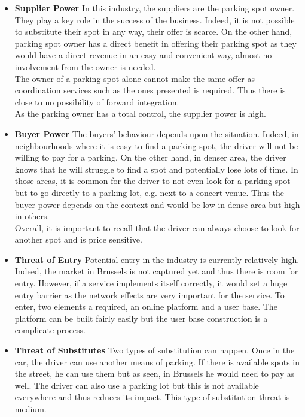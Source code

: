 \documentclass[12pt,a4paper,oneside]{book}
\begin{document}
\begin{itemize}
\item \textbf{Supplier Power} In this industry, the suppliers are the parking spot owner. They play a key role in the success of the business. Indeed, it is not possible to substitute their spot in any way, their offer is scarce. On the other hand, parking spot owner has a direct benefit in offering their parking spot as they would have a direct revenue in an easy and convenient way, almost no involvement from the owner is needed.\\
The owner of a parking spot alone cannot make the same offer as coordination services such as the ones presented is required. Thus there is close to no possibility of forward integration.\\
As the parking owner has a total control, the supplier power is high.
\item \textbf{Buyer Power} The buyers' behaviour depends upon the situation. Indeed, in neighbourhoods where it is easy to find a parking spot, the driver will not be willing to pay for a parking. On the other hand, in denser area, the driver knows that he will struggle to find a spot and potentially lose lots of time. In those areas, it is common for the driver to not even look for a parking spot but to go directly to a parking lot, e.g. next to a concert venue. Thus the buyer power depends on the context and would be low in dense area but high in others.\\
Overall, it is important to recall that the driver can always choose to look for another spot and is price sensitive.
\item \textbf{Threat of Entry} Potential entry in the industry is currently relatively high. Indeed, the market in Brussels is not captured yet and thus there is room for entry. However, if a service implements itself correctly, it would set a huge entry barrier as the network effects are very important for the service. To enter, two elements a required, an online platform and a user base. The platform can be built fairly easily but the user base construction is a complicate process.
\item \textbf{Threat of Substitutes} Two types of substitution can happen. Once in the car, the driver can use another means of parking. If there is available spots in the street, he can use them but as seen, in Brussels he would need to pay as well. The driver can also use a parking lot but this is not available everywhere and thus reduces its impact. This type of substitution threat is medium.\\

\end{itemize}
\end{document}
